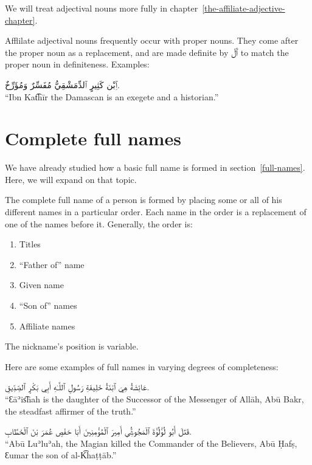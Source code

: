 \documentclass[
  10pt,
]{book}
\providecommand{\tightlist}{%
  \setlength{\itemsep}{0pt}\setlength{\parskip}{0pt}}
\begin{document}
We will treat adjectival nouns more fully in chapter~\ref{the-affiliate-adjective-chapter}.

Afflilate adjectival nouns frequently occur with proper nouns. They come after the proper noun as a replacement, and are made definite by \foreignlanguage{arabic}{ٱَلْ} to match the proper noun in definiteness. Examples:

\foreignlanguage{arabic}{ٱِبْن کَثِيرٍ ٱلدِّمَشْقِيُّ مُفَسِّرٌ وَمُؤَرِّخٌ.}\\
\enquote{Ibn Kat͡hīr the Damascan is an exegete and a historian.}

\section{Complete full names}\label{complete-full-names}

We have already studied how a basic full name is formed in section~\ref{full-names}. Here, we will expand on that topic.

The complete full name of a person is formed by placing some or all of his different names in a particular order. Each name in the order is a replacement of one of the names before it. Generally, the order is:

\begin{enumerate}
\def\labelenumi{\roman{enumi}.}
\tightlist
\item
  Titles
\item
  \enquote{Father of} name
\item
  Given name
\item
  \enquote{Son of} names
\item
  Affiliate names
\end{enumerate}

The nickname's position is variable.

Here are some examples of full names in varying degrees of completeness:

\foreignlanguage{arabic}{عَائِشَةُ هِيَ ٱبْنَةُ خَلِيفَةِ رَسُولِ ٱللَّـٰهِ أَبِي بَکْرٍ ٱلصِّدِّيقِ.}\\
\enquote{Ɛāʾis͡hah is the daughter of the Successor of the Messenger of Allāh, Abū Bakr, the steadfast affirmer of the truth.}

\foreignlanguage{arabic}{قَتَلَ أَبُو لُؤْلُؤَةَ ٱلْمَجُوسِيُّ أَمِيرَ ٱلْمُؤْمِنِينَ أَبَا حَفْصٍ عُمَرَ بْنَ ٱلْخَطَّابِ.}\\
\enquote{Abū Luʾluʾah, the Magian killed the Commander of the Believers, Abū Ḥafṣ, Ɛumar the son of al-K͡haṭṭāb.}
\end{document}

